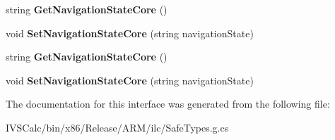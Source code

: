 \begin{DoxyCompactItemize}
string {\bfseries Get\+Navigation\+State\+Core} ()
\item 
\mbox{\label{interface_windows_1_1_u_i_1_1_xaml_1_1_media_1_1_animation_1_1_i_navigation_transition_info_overrides_a7799a65485cc4aeea12257f0c72d8de1}} 
void {\bfseries Set\+Navigation\+State\+Core} (string navigation\+State)
\item 
\mbox{\label{interface_windows_1_1_u_i_1_1_xaml_1_1_media_1_1_animation_1_1_i_navigation_transition_info_overrides_aefd894711581d29e2a7bf56554a261fc}} 
string {\bfseries Get\+Navigation\+State\+Core} ()
\item 
\mbox{\label{interface_windows_1_1_u_i_1_1_xaml_1_1_media_1_1_animation_1_1_i_navigation_transition_info_overrides_a7799a65485cc4aeea12257f0c72d8de1}} 
void {\bfseries Set\+Navigation\+State\+Core} (string navigation\+State)
\end{DoxyCompactItemize}


The documentation for this interface was generated from the following file\+:\begin{DoxyCompactItemize}
\item 
I\+V\+S\+Calc/bin/x86/\+Release/\+A\+R\+M/ilc/Safe\+Types.\+g.\+cs\end{DoxyCompactItemize}

